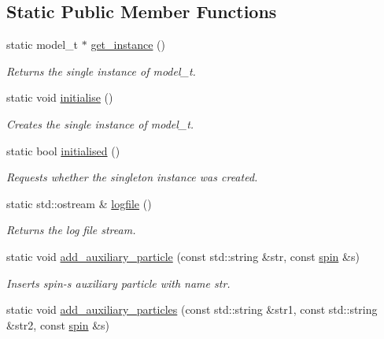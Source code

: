 \subsection*{Static Public Member Functions}
\begin{DoxyCompactItemize}
\item 
static model\+\_\+t $\ast$ \hyperlink{a00372_addb0565969863861ecfb72877717b1e6}{get\+\_\+instance} ()
\begin{DoxyCompactList}\small\item\em Returns the single instance of model\+\_\+t. \end{DoxyCompactList}\item 
static void \hyperlink{a00372_aac3264ce0db5925641f695c1b0fdfcac}{initialise} ()
\begin{DoxyCompactList}\small\item\em Creates the single instance of model\+\_\+t. \end{DoxyCompactList}\item 
\hypertarget{a00372_ab917e4ae26df6441d5edbb4a18009610}{}static bool \hyperlink{a00372_ab917e4ae26df6441d5edbb4a18009610}{initialised} ()\label{a00372_ab917e4ae26df6441d5edbb4a18009610}

\begin{DoxyCompactList}\small\item\em Requests whether the singleton instance was created. \end{DoxyCompactList}\item 
\hypertarget{a00372_ac4c8696fff15e80f82dbc71b0fad5f0c}{}static std\+::ostream \& \hyperlink{a00372_ac4c8696fff15e80f82dbc71b0fad5f0c}{logfile} ()\label{a00372_ac4c8696fff15e80f82dbc71b0fad5f0c}

\begin{DoxyCompactList}\small\item\em Returns the log file stream. \end{DoxyCompactList}\item 
static void \hyperlink{a00372_a37ba372a5b17bbb43840f2f195b7622d}{add\+\_\+auxiliary\+\_\+particle} (const std\+::string \&str, const \hyperlink{a00514}{spin} \&s)
\begin{DoxyCompactList}\small\item\em Inserts spin-\/s auxiliary particle with name str. \end{DoxyCompactList}\item 
\hypertarget{a00372_a029fc5fabfc31ac9f3cd71420c2302d7}{}static void \hyperlink{a00372_a029fc5fabfc31ac9f3cd71420c2302d7}{add\+\_\+auxiliary\+\_\+particles} (const std\+::string \&str1, const std\+::string \&str2, const \hyperlink{a00514}{spin} \&s)\label{a00372_a029fc5fabfc31ac9f3cd71420c2302d7}


\end{DoxyCompactItemize}
